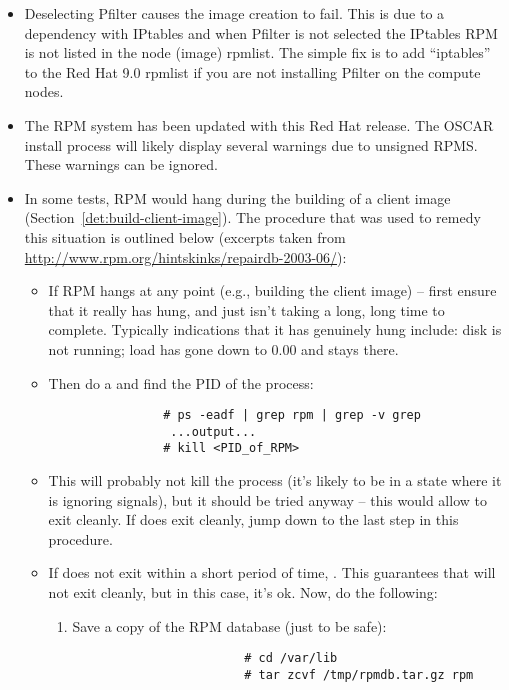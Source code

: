 \begin{itemize}

\item Deselecting Pfilter causes the image creation to fail.  This is
  due to a dependency with IPtables and when Pfilter is not selected
  the IPtables RPM is not listed in the node (image) rpmlist.   The simple
  fix is to add ``iptables'' to the Red Hat 9.0 rpmlist if you are not
  installing Pfilter on the compute nodes.

\item The RPM system has been updated with this Red Hat release.  The
 OSCAR install process will likely display several warnings due to unsigned
 RPMS.  These warnings can be ignored. 

\item In some tests, RPM would hang during the building of a client image
(Section~\ref{det:build-client-image}).  The procedure that was used to
remedy this situation is outlined below (excerpts taken from
\url{http://www.rpm.org/hintskinks/repairdb-2003-06/}):
	\begin{itemize}
		\item If RPM hangs at any point (e.g., building the client image)
		-- first ensure that it really has hung, and just isn't taking a
		long, long time to complete.  Typically indications that it has
		genuinely hung include: disk is not running; load has gone
		down to 0.00 and stays there.

		\item Then do a  and find the PID of the  process: 
			\begin{verbatim}
				# ps -eadf | grep rpm | grep -v grep
				 ...output...
				# kill <PID_of_RPM>
			\end{verbatim}

		\item This will probably not kill the process (it's likely to be in
		a state where it is ignoring signals), but it should be tried
		anyway -- this would allow  to exit cleanly.  If  
		does  exit cleanly, jump down to the last step in this procedure.

		\item If  does not exit within a short period of time,
		.  This guarantees that  will
		not exit cleanly, but in this case, it's ok.  Now, do the
		following:
			\begin{enumerate}
				\item Save a copy of the RPM database (just to be safe):
					\begin{verbatim}
						# cd /var/lib
						# tar zcvf /tmp/rpmdb.tar.gz rpm
					\end{verbatim}


\end{enumerate}
\end{itemize}
\end{itemize}
